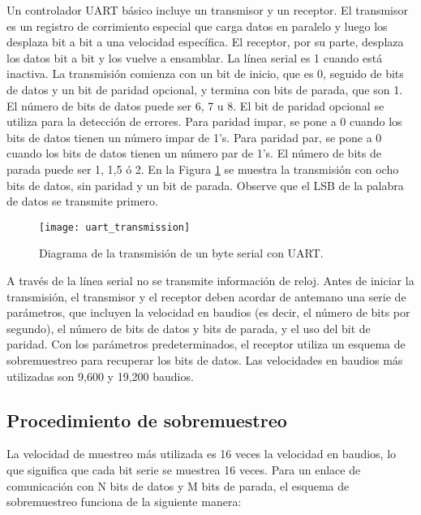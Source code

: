     Un controlador UART básico incluye un transmisor y un receptor. El transmisor es un registro de corrimiento especial que carga datos en paralelo y luego los desplaza bit a bit a una velocidad específica. El receptor, por su parte, desplaza los datos bit a bit y los vuelve a ensamblar. La línea serial es 1 cuando está inactiva. La transmisión comienza con un bit de inicio, que es 0, seguido de bits de datos y un bit de paridad opcional, y termina con bits de parada, que son 1. El número de bits de datos puede ser 6, 7 u 8. El bit de paridad opcional se utiliza para la detección de errores. Para paridad impar, se pone a 0 cuando los bits de datos tienen un número impar de 1's. Para paridad par, se pone a 0 cuando los bits de datos tienen un número par de 1's. El número de bits de parada puede ser 1, 1,5 ó 2. En la Figura \ref{fig:uart_transmission} se muestra la transmisión con ocho bits de datos, sin paridad y un bit de parada. Observe que el LSB de la palabra de datos se transmite primero.

    \begin{figure}[hbtp]
      \centering
      \texttt{[image: uart\_transmission]}
      \caption{Diagrama de la transmisión de un byte serial con UART.}
      \label{fig:uart_transmission}
    \end{figure}

    A través de la línea serial no se transmite información de reloj. Antes de iniciar la transmisión, el transmisor y el receptor deben acordar de antemano una serie de parámetros, que incluyen la velocidad en baudios (es decir, el número de bits por segundo), el número de bits de datos y bits de parada, y el uso del bit de paridad. Con los parámetros predeterminados, el receptor utiliza un esquema de sobremuestreo para recuperar los bits de datos. Las velocidades en baudios más utilizadas son 9,600 y 19,200 baudios.

    \subsection{Procedimiento de sobremuestreo} \label{sec:sobremuestreo}

    La velocidad de muestreo más utilizada es 16 veces la velocidad en baudios, lo que significa que cada bit serie se muestrea 16 veces. Para un enlace de comunicación con N bits de datos y M bits de parada, el esquema de sobremuestreo funciona de la siguiente manera:
    
